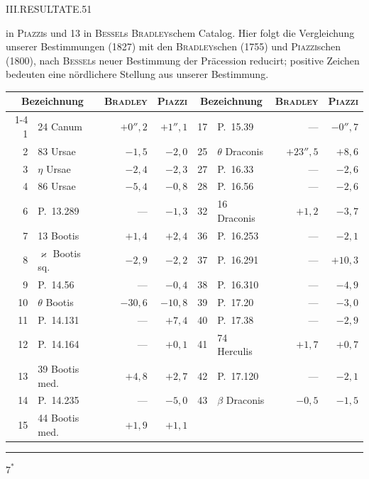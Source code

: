 \clearpage
\noindent\mbox{}\hfill III.\quad RESULTATE.\hfill 51\par
{} in \textsc{Piazzi}s und 13 in \textsc{Bessel}s \textsc{Bradley}schem Catalog. Hier folgt die Vergleichung unserer Bestimmungen (1827) mit den \textsc{Bradley}schen (1755) und \textsc{Piazzi}schen (1800), nach \textsc{Bessel}s neuer Bestimmung der Präcession reducirt; positive Zeichen bedeuten eine nördlichere Stellung aus unserer Bestimmung.
\begin{center}
{\small\setlength{\tabcolsep}{4pt}
\begin{tabular}{r|l|r|r||r|l|r|r}
\multicolumn{2}{c|}{Bezeichnung}&\textsc{Bradley}&\textsc{Piazzi}&\multicolumn{2}{c|}{Bezeichnung}&\textsc{Bradley}&\textsc{Piazzi}\\\cline{1-4}\cline{5-8}
1&24 Canum&$+0''{,}2$&$+1''{,}1$&17&P.\ 15.39&—&$-0''{,}7$\\
2&83 Ursae&$-1{,}5$&$-2{,}0$&25&$\theta$ Draconis&$+23''{,}5$&$+8{,}6$\\
3&$\eta$ Ursae&$-2{,}4$&$-2{,}3$&27&P.\ 16.33&—&$-2{,}6$\\
4&86 Ursae&$-5{,}4$&$-0{,}8$&28&P.\ 16.56&—&$-2{,}6$\\
6&P.\ 13.289&—&$-1{,}3$&32&16 Draconis&$+1{,}2$&$-3{,}7$\\
7&13 Bootis&$+1{,}4$&$+2{,}4$&36&P.\ 16.253&—&$-2{,}1$\\
8&$\varkappa$ Bootis sq.&$-2{,}9$&$-2{,}2$&37&P.\ 16.291&—&$+10{,}3$\\
9&P.\ 14.56&—&$-0{,}4$&38&P.\ 16.310&—&$-4{,}9$\\
10&$\theta$ Bootis&$-30{,}6$&$-10{,}8$&39&P.\ 17.20&—&$-3{,}0$\\
11&P.\ 14.131&—&$+7{,}4$&40&P.\ 17.38&—&$-2{,}9$\\
12&P.\ 14.164&—&$+0{,}1$&41&74 Herculis&$+1{,}7$&$+0{,}7$\\
13&39 Bootis med.&$+4{,}8$&$+2{,}7$&42&P.\ 17.120&—&$-2{,}1$\\
14&P.\ 14.235&—&$-5{,}0$&43&$\beta$ Draconis&$-0{,}5$&$-1{,}5$\\
15&44 Bootis med.&$+1{,}9$&$+1{,}1$&&&&
\end{tabular}}
\end{center}
\vspace{14mm}
\begin{center}\rule{.25\textwidth}{.4pt}\end{center}
\noindent\hfill $7^*$\par

